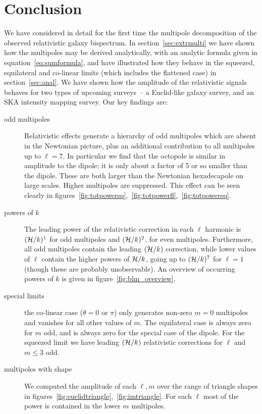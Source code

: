 {\section{Conclusion}\label{sec:concl}
%
We have considered in detail for the first time the multipole decomposition of the observed relativistic galaxy bispectrum. In section~\ref{sec:extrmulti} we have shown how the multipoles may be derived analytically, with an analytic formula given in equation~\eqref{eq:sumformula}, and have illustrated how they behave in the squeezed, equilateral and co-linear limits (which includes the flattened case) in section~\ref{sec:anal}. We have shown how the amplitude of the relativistic signals behaves for two types of upcoming surveys~-- a Euclid-like galaxy survey, and an SKA intensity mapping survey. Our key findings are:
\begin{description}
\item[odd multipoles] Relativistic effects generate a hierarchy of odd multipoles which are absent in the Newtonian picture, plus an additional contribution to all multipoles up to $\ell=7$. In particular we find that the octopole is similar in amplitude to the dipole; it is only about a factor of 5 or so smaller than the dipole. These are both larger than the Newtonian hexadecapole on large scales. Higher multipoles are suppressed. This effect can be seen clearly in figures~\ref{fig:totpowersq},~\ref{fig:totpowerfl},~\ref{fig:totpowereq}.
%
\item[powers of $k$] The leading power of the relativistic correction in each $\ell$ harmonic is $(\mathcal{H}/k)^1$ for odd multipoles and $(\mathcal{H}/k)^2$, for even multipoles. Furthermore, all odd multipoles contain the leading $(\mathcal{H}/k)$ correction, while lower values of \(\ell\) contain the higher powers of \(\mathcal{H}/k\), going up to \((\mathcal{H}/k)^7\) for \(\ell=1\) (though these are probably unobservable). An overview of occurring powers of \(k\) is given in figure~\ref{fig:blm_overview}.
%
\item[special limits] the co-linear case ($\theta=0$ or $\pi$) only generates non-zero $m=0$ multipoles and vanishes for all other values of \(m\). The equilateral case is always zero for $m$ odd, and is always zero for the special case of the dipole. For the squeezed limit we have leading $(\mathcal{H}/k)$ relativistic corrections for $\ell$ and $m\leq3$ odd.
%
\item[multipoles with shape] We computed the amplitude of each $\ell,m$ over the range of triangle shapes in figures~\ref{fig:euclidtriangle},~\ref{fig:imtriangle}. For each $\ell$ most of the power is contained in the lower $m$ multipoles. 

\end{description}}
